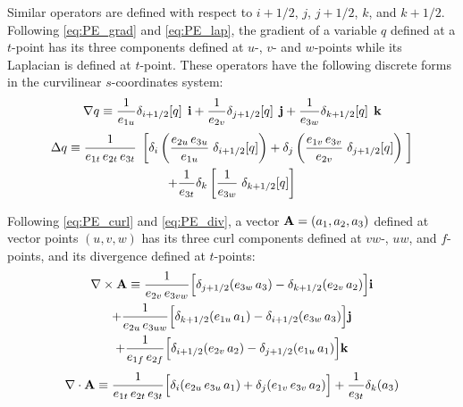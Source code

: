 \documentclass[../main/NEMO_manual]{subfiles}
\begin{document}
Similar operators are defined with respect to $i + 1/2$, $j$, $j + 1/2$, $k$, and $k + 1/2$.
Following \autoref{eq:PE_grad} and \autoref{eq:PE_lap}, the gradient of a variable $q$ defined at
a $t$-point has its three components defined at $u$-, $v$- and $w$-points while
its Laplacian is defined at $t$-point.
These operators have the following discrete forms in the curvilinear $s$-coordinates system:
\[
  \nabla q \equiv   \frac{1}{e_{1u}} \delta_{i + 1/2} [q] \; \, \mathbf{i}
                  + \frac{1}{e_{2v}} \delta_{j + 1/2} [q] \; \, \mathbf{j}
                  + \frac{1}{e_{3w}} \delta_{k + 1/2} [q] \; \, \mathbf{k}
\]
\begin{multline*}
  \Delta q \equiv   \frac{1}{e_{1t} \, e_{2t} \, e_{3t}}
                    \; \left[   \delta_i \left( \frac{e_{2u} \, e_{3u}}{e_{1u}} \; \delta_{i + 1/2} [q] \right)
                            + \delta_j \left( \frac{e_{1v} \, e_{3v}}{e_{2v}} \; \delta_{j + 1/2} [q] \right) \; \right] \\
                  + \frac{1}{e_{3t}}
                              \delta_k \left[ \frac{1              }{e_{3w}} \; \delta_{k + 1/2} [q] \right]
\end{multline*}

Following \autoref{eq:PE_curl} and \autoref{eq:PE_div}, a vector $\mathbf{A} = (a_1,a_2,a_3)$ defined at
vector points $(u,v,w)$ has its three curl components defined at $vw$-, $uw$, and $f$-points, and
its divergence defined at $t$-points:
\begin{multline}
  \nabla \times \mathbf{A} \equiv   \frac{1}{e_{2v} \, e_{3vw}}
                                 \Big[   \delta_{j + 1/2} (e_{3w} \, a_3)
                                       - \delta_{k + 1/2} (e_{2v} \, a_2) \Big] \mathbf{i} \\
                               + \frac{1}{e_{2u} \, e_{3uw}}
                                 \Big[   \delta_{k + 1/2} (e_{1u} \, a_1)
                                       - \delta_{i + 1/2} (e_{3w} \, a_3) \Big] \mathbf{j} \\
                               + \frac{1}{e_{1f} \, e_{2f}}
                                 \Big[   \delta_{i + 1/2} (e_{2v} \, a_2)
                                       - \delta_{j + 1/2} (e_{1u} \, a_1) \Big] \mathbf{k}
\end{multline}
\begin{equation}
  \nabla \cdot \mathbf{A} \equiv   \frac{1}{e_{1t} \, e_{2t} \, e_{3t}}
                                \Big[ \delta_i (e_{2u} \, e_{3u} \, a_1) + \delta_j (e_{1v} \, e_{3v} \, a_2) \Big]
                              + \frac{1}{e_{3t}} \delta_k (a_3)
\end{equation}
\end{document}
